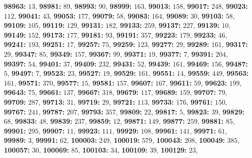 \textsf{\bfseries 98963:} $13$, \textsf{\bfseries 98981:} $89$, \textsf{\bfseries 98993:} $90$, \textsf{\bfseries 98999:} $163$, \textsf{\bfseries 99013:} $158$, \textsf{\bfseries 99017:} $248$, \textsf{\bfseries 99023:} $112$, \textsf{\bfseries 99041:} $43$, \textsf{\bfseries 99053:} $177$, \textsf{\bfseries 99079:} $58$, \textsf{\bfseries 99083:} $164$, \textsf{\bfseries 99089:} $30$, \textsf{\bfseries 99103:} $58$, \textsf{\bfseries 99109:} $105$, \textsf{\bfseries 99119:} $129$, \textsf{\bfseries 99131:} $182$, \textsf{\bfseries 99133:} $259$, \textsf{\bfseries 99137:} $227$, \textsf{\bfseries 99139:} $10$, \textsf{\bfseries 99149:} $152$, \textsf{\bfseries 99173:} $177$, \textsf{\bfseries 99181:} $93$, \textsf{\bfseries 99191:} $357$, \textsf{\bfseries 99223:} $179$, \textsf{\bfseries 99233:} $46$, \textsf{\bfseries 99241:} $193$, \textsf{\bfseries 99251:} $17$, \textsf{\bfseries 99257:} $75$, \textsf{\bfseries 99259:} $123$, \textsf{\bfseries 99277:} $29$, \textsf{\bfseries 99289:} $161$, \textsf{\bfseries 99317:} $29$, \textsf{\bfseries 99347:} $85$, \textsf{\bfseries 99349:} $157$, \textsf{\bfseries 99367:} $99$, \textsf{\bfseries 99371:} $19$, \textsf{\bfseries 99377:} $7$, \textsf{\bfseries 99391:} $204$, \textsf{\bfseries 99397:} $54$, \textsf{\bfseries 99401:} $37$, \textsf{\bfseries 99409:} $232$, \textsf{\bfseries 99431:} $52$, \textsf{\bfseries 99439:} $161$, \textsf{\bfseries 99469:} $156$, \textsf{\bfseries 99487:} $5$, \textsf{\bfseries 99497:} $7$, \textsf{\bfseries 99523:} $23$, \textsf{\bfseries 99527:} $19$, \textsf{\bfseries 99529:} $161$, \textsf{\bfseries 99551:} $14$, \textsf{\bfseries 99559:} $449$, \textsf{\bfseries 99563:} $161$, \textsf{\bfseries 99571:} $370$, \textsf{\bfseries 99577:} $15$, \textsf{\bfseries 99581:} $157$, \textsf{\bfseries 99607:} $167$, \textsf{\bfseries 99611:} $59$, \textsf{\bfseries 99623:} $199$, \textsf{\bfseries 99643:} $75$, \textsf{\bfseries 99661:} $137$, \textsf{\bfseries 99667:} $318$, \textsf{\bfseries 99679:} $117$, \textsf{\bfseries 99689:} $159$, \textsf{\bfseries 99707:} $79$, \textsf{\bfseries 99709:} $287$, \textsf{\bfseries 99713:} $31$, \textsf{\bfseries 99719:} $29$, \textsf{\bfseries 99721:} $113$, \textsf{\bfseries 99733:} $176$, \textsf{\bfseries 99761:} $150$, \textsf{\bfseries 99767:} $241$, \textsf{\bfseries 99787:} $207$, \textsf{\bfseries 99793:} $357$, \textsf{\bfseries 99809:} $22$, \textsf{\bfseries 99817:} $5$, \textsf{\bfseries 99823:} $39$, \textsf{\bfseries 99829:} $68$, \textsf{\bfseries 99833:} $48$, \textsf{\bfseries 99839:} $237$, \textsf{\bfseries 99859:} $12$, \textsf{\bfseries 99871:} $149$, \textsf{\bfseries 99877:} $259$, \textsf{\bfseries 99881:} $85$, \textsf{\bfseries 99901:} $295$, \textsf{\bfseries 99907:} $11$, \textsf{\bfseries 99923:} $111$, \textsf{\bfseries 99929:} $108$, \textsf{\bfseries 99961:} $141$, \textsf{\bfseries 99971:} $61$, \textsf{\bfseries 99989:} $3$, \textsf{\bfseries 99991:} $62$, \textsf{\bfseries 100003:} $249$, \textsf{\bfseries 100019:} $579$, \textsf{\bfseries 100043:} $208$, \textsf{\bfseries 100049:} $385$, \textsf{\bfseries 100057:} $30$, \textsf{\bfseries 100069:} $85$, \textsf{\bfseries 100103:} $34$, \textsf{\bfseries 100109:} $39$, \textsf{\bfseries 100129:} $23$, 
